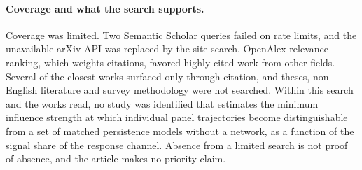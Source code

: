 \paragraph{Coverage and what the search supports.}
Coverage was limited. Two Semantic Scholar queries failed on rate limits, and the unavailable arXiv API was replaced by the site search. OpenAlex relevance ranking, which weights citations, favored highly cited work from other fields. Several of the closest works surfaced only through citation, and theses, non-English literature and survey methodology were not searched. Within this search and the works read, no study was identified that estimates the minimum influence strength at which individual panel trajectories become distinguishable from a set of matched persistence models without a network, as a function of the signal share of the response channel. Absence from a limited search is not proof of absence, and the article makes no priority claim.
